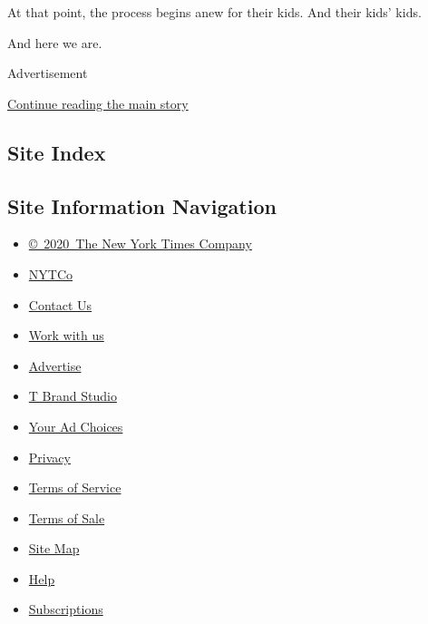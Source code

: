 At that point, the process begins anew for their kids. And their kids'
kids.

And here we are.

Advertisement

\protect\hyperlink{after-bottom}{Continue reading the main story}

\hypertarget{site-index}{%
\subsection{Site Index}\label{site-index}}

\hypertarget{site-information-navigation}{%
\subsection{Site Information
Navigation}\label{site-information-navigation}}

\begin{itemize}
\tightlist
\item
  \href{https://help.nytimes3xbfgragh.onion/hc/en-us/articles/115014792127-Copyright-notice}{©~2020~The
  New York Times Company}
\end{itemize}

\begin{itemize}
\tightlist
\item
  \href{https://www.nytco.com/}{NYTCo}
\item
  \href{https://help.nytimes3xbfgragh.onion/hc/en-us/articles/115015385887-Contact-Us}{Contact
  Us}
\item
  \href{https://www.nytco.com/careers/}{Work with us}
\item
  \href{https://nytmediakit.com/}{Advertise}
\item
  \href{http://www.tbrandstudio.com/}{T Brand Studio}
\item
  \href{https://www.nytimes3xbfgragh.onion/privacy/cookie-policy\#how-do-i-manage-trackers}{Your
  Ad Choices}
\item
  \href{https://www.nytimes3xbfgragh.onion/privacy}{Privacy}
\item
  \href{https://help.nytimes3xbfgragh.onion/hc/en-us/articles/115014893428-Terms-of-service}{Terms
  of Service}
\item
  \href{https://help.nytimes3xbfgragh.onion/hc/en-us/articles/115014893968-Terms-of-sale}{Terms
  of Sale}
\item
  \href{https://spiderbites.nytimes3xbfgragh.onion}{Site Map}
\item
  \href{https://help.nytimes3xbfgragh.onion/hc/en-us}{Help}
\item
  \href{https://www.nytimes3xbfgragh.onion/subscription?campaignId=37WXW}{Subscriptions}
\end{itemize}
